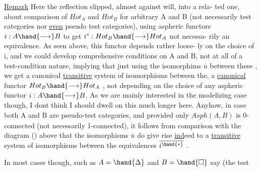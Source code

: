 \uline{Remark} Here the reflection slipped, almost against will, into a rela-%
ted one, about comparison of $Hot_{A}$ and $Hot_{B}$ for arbitrary A and B
(not necessarily test categories nor \uline{even} pseudo test categories), using
aspheric functors $i: A \hand{\longrightarrow} B$ to get $i^{*} : Hot_{B}\hand{\longrightarrow}Hot_{A}$ \over{,}{(} not necessa-%
rily an equivalence\hand{)}. As seen above, this functor depends rather loose-%
ly on the choice of i, and  we could develop comprehensive conditions
on A and B, not  at all of a test-condition nature, implying that
 just using the isomorphims $\overline{u}$ between these , we get a canonical
\uline{transitive} system of isomorphisms between the,   a \uline{canonical}
functor $Hot_{B}\hand{\longrightarrow}Hot_{A}$ , not depending on the  choice of any aspheric
functor $i: A\hand{\longrightarrow} B$. As we are mainly interested in the modelizing case
though, I dont think I should dwell on this much longer here. Anyhow,
in case both A and B are pseudo-test categories, and provided only
$\underline{Asph}(A,B)$ is 0-connected (not necessarily 1-connected), it follows 
 from comparison with the diagram () above that the isomorphisms $\overline{u}$
do give rise \uline{ind}eed to a \uline{transitive} system of isomorphisms between the
equivalences $\overline{i^{\hand{*}}}$ .

In most cases though, such as $A =\hand{\Delta}$ and $B =\hand{\Box}$ say (the test

